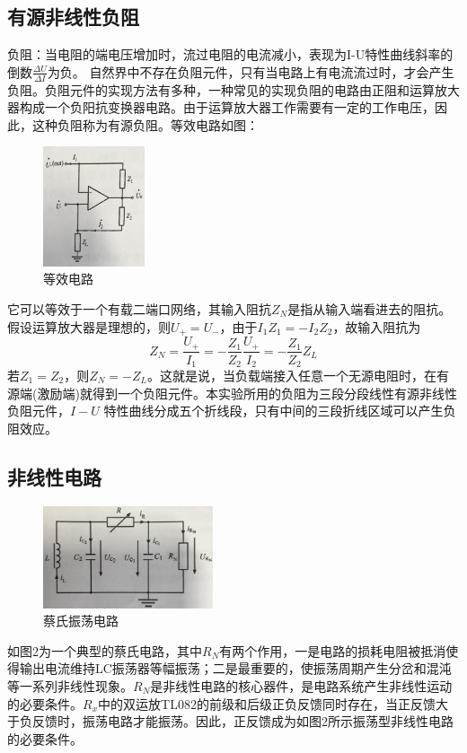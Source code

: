 \documentclass[UTF8]{ctexart}
\begin{document}
\begin{multicols}{2}
\subsection{有源非线性负阻}
负阻：当电阻的端电压增加时，流过电阻的电流减小，表现为I-U特性曲线斜率的倒数$\frac{\Delta U}{\Delta I}$为负。
自然界中不存在负阻元件，只有当电路上有电流流过时，才会产生负阻。负阻元件的实现方法有多种，一种常见的实现负阻的电路由正阻和运算放大器构成一个负阳抗变换器电路。由于运算放大器工作需要有一定的工作电压，因此，这种负阻称为有源负阻。等效电路如图：
\begin{figure}[H]
\centering
\includegraphics[width=3cm]{2.jpg}
\caption{等效电路}
\end{figure}
它可以等效于一个有载二端口网络，其输入阻抗$Z_N$是指从输入端看进去的阻抗。假设运算放大器是理想的，则$U_{+}=U_{-}$，由于$I_1Z_1=-I_2Z_2$，故输入阻抗为
\begin{equation}
Z_N=\frac{U_+}{I_1}=-\frac{Z_1}{Z_2}\frac{U_+}{I_2}=-\frac{Z_1}{Z_2}Z_L
\end{equation}
若$Z_1=Z_2$，则$Z_N=-Z_L$。这就是说，当负载端接入任意一个无源电阻时，在有源端(激励端)就得到一个负阻元件。本实验所用的负阻为三段分段线性有源非线性负阻元件，$I-U$ 特性曲线分成五个折线段，只有中间的三段折线区域可以产生负阻效应。

\subsection{非线性电路}
\begin{figure}[H]
\centering
\includegraphics[width=5cm]{5.jpg}
\caption{蔡氏振荡电路}
\end{figure}
如图2为一个典型的蔡氏电路，其中$R_N$有两个作用，一是电路的损耗电阻被抵消使得输出电流维持LC振荡器等幅振荡；二是最重要的，使振荡周期产生分岔和混沌等一系列非线性现象。$R_N$是非线性电路的核心器件，是电路系统产生非线性运动的必要条件。$R_x$中的双运放TL082的前级和后级正负反馈同时存在，当正反馈大于负反馈时，振荡电路才能振荡。因此，正反馈成为如图2所示振荡型非线性电路的必要条件。


\end{multicols}
\end{document}
